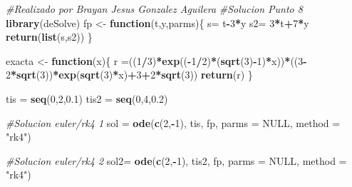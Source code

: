 \documentclass[]{article}
\newenvironment{Shaded}{\begin{snugshade}}{\end{snugshade}}
\newcommand{\KeywordTok}[1]{\textcolor[rgb]{0.13,0.29,0.53}{\textbf{#1}}}
\newcommand{\DataTypeTok}[1]{\textcolor[rgb]{0.13,0.29,0.53}{#1}}
\newcommand{\DecValTok}[1]{\textcolor[rgb]{0.00,0.00,0.81}{#1}}
\newcommand{\FloatTok}[1]{\textcolor[rgb]{0.00,0.00,0.81}{#1}}
\newcommand{\StringTok}[1]{\textcolor[rgb]{0.31,0.60,0.02}{#1}}
\newcommand{\CommentTok}[1]{\textcolor[rgb]{0.56,0.35,0.01}{\textit{#1}}}
\newcommand{\OtherTok}[1]{\textcolor[rgb]{0.56,0.35,0.01}{#1}}
\newcommand{\ControlFlowTok}[1]{\textcolor[rgb]{0.13,0.29,0.53}{\textbf{#1}}}
\newcommand{\OperatorTok}[1]{\textcolor[rgb]{0.81,0.36,0.00}{\textbf{#1}}}
\newcommand{\NormalTok}[1]{#1}
\begin{document}
\begin{Shaded}
\begin{Highlighting}[]
\CommentTok{#Realizado por Brayan Jesus Gonzalez Aguilera}
\CommentTok{#Solucion Punto 8}
\KeywordTok{library}\NormalTok{(deSolve)}
\NormalTok{fp <-}\StringTok{ }\ControlFlowTok{function}\NormalTok{(t,y,parms)\{}
\NormalTok{  s=}\StringTok{ }\NormalTok{t}\OperatorTok{-}\DecValTok{3}\OperatorTok{*}\NormalTok{y}
\NormalTok{  s2=}\StringTok{ }\DecValTok{3}\OperatorTok{*}\NormalTok{t}\OperatorTok{+}\DecValTok{7}\OperatorTok{*}\NormalTok{y}
  \KeywordTok{return}\NormalTok{(}\KeywordTok{list}\NormalTok{(s,s2))}
\NormalTok{\}}

\NormalTok{exacta <-}\StringTok{ }\ControlFlowTok{function}\NormalTok{(x)\{}
\NormalTok{  r =((}\DecValTok{1}\OperatorTok{/}\DecValTok{3}\NormalTok{)}\OperatorTok{*}\KeywordTok{exp}\NormalTok{((}\OperatorTok{-}\DecValTok{1}\OperatorTok{/}\DecValTok{2}\NormalTok{)}\OperatorTok{*}\NormalTok{(}\KeywordTok{sqrt}\NormalTok{(}\DecValTok{3}\NormalTok{)}\OperatorTok{-}\DecValTok{1}\NormalTok{)}\OperatorTok{*}\NormalTok{x))}\OperatorTok{*}\NormalTok{((}\DecValTok{3}\OperatorTok{-}\DecValTok{2}\OperatorTok{*}\KeywordTok{sqrt}\NormalTok{(}\DecValTok{3}\NormalTok{))}\OperatorTok{*}\KeywordTok{exp}\NormalTok{(}\KeywordTok{sqrt}\NormalTok{(}\DecValTok{3}\NormalTok{)}\OperatorTok{*}\NormalTok{x)}\OperatorTok{+}\DecValTok{3}\OperatorTok{+}\DecValTok{2}\OperatorTok{*}\KeywordTok{sqrt}\NormalTok{(}\DecValTok{3}\NormalTok{))}
  \KeywordTok{return}\NormalTok{(r)}
\NormalTok{\}}

\NormalTok{tis =}\StringTok{ }\KeywordTok{seq}\NormalTok{(}\DecValTok{0}\NormalTok{,}\DecValTok{2}\NormalTok{,}\FloatTok{0.1}\NormalTok{)}
\NormalTok{tis2 =}\StringTok{ }\KeywordTok{seq}\NormalTok{(}\DecValTok{0}\NormalTok{,}\DecValTok{4}\NormalTok{,}\FloatTok{0.2}\NormalTok{)}

\CommentTok{#Solucion euler/rk4 1}
\NormalTok{sol =}\StringTok{ }\KeywordTok{ode}\NormalTok{(}\KeywordTok{c}\NormalTok{(}\DecValTok{2}\NormalTok{,}\OperatorTok{-}\DecValTok{1}\NormalTok{), tis, fp, }\DataTypeTok{parms =} \OtherTok{NULL}\NormalTok{, }\DataTypeTok{method =} \StringTok{"rk4"}\NormalTok{)}

\CommentTok{#Solucion euler/rk4 2}
\NormalTok{sol2=}\StringTok{ }\KeywordTok{ode}\NormalTok{(}\KeywordTok{c}\NormalTok{(}\DecValTok{2}\NormalTok{,}\OperatorTok{-}\DecValTok{1}\NormalTok{), tis2, fp, }\DataTypeTok{parms =} \OtherTok{NULL}\NormalTok{, }\DataTypeTok{method =} \StringTok{"rk4"}\NormalTok{)}


\end{Highlighting}
\end{Shaded}
\end{document}
